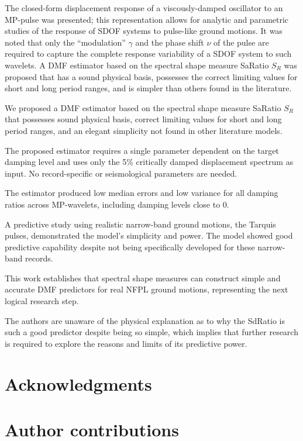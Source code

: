 The closed-form displacement response of a viscously-damped oscillator
to an MP-pulse was presented; this representation allows for analytic
and parametric studies of the response of SDOF systems to pulse-like
ground motions. It was noted that only the ``modulation'' \(\gamma\) and
the phase shift \(\nu\) of the pulse are required to capture the
complete response variability of a SDOF system to such wavelets. A DMF
estimator based on the spectral shape measure SaRatio \(S_R\) was
proposed that has a sound physical basis, possesses the correct limiting
values for short and long period ranges, and is simpler than others
found in the literature.

We proposed a DMF estimator based on the spectral shape measure SaRatio
\(S_R\) that possesses sound physical basis, correct limiting values for
short and long period ranges, and an elegant simplicity not found in
other literature models.

The proposed estimator requires a single parameter dependent on the
target damping level and uses only the 5\% critically damped
displacement spectrum as input. No record-specific or seismological
parameters are needed.

The estimator produced low median errors and low variance for all
damping ratios across MP-wavelets, including damping levels close to 0.

A predictive study using realistic narrow-band ground motions, the
Tarquis pulses, demonstrated the model's simplicity and power. The model
showed good predictive capability despite not being specifically
developed for these narrow-band records.

This work establishes that spectral shape measures can construct simple
and accurate DMF predictors for real NFPL ground motions, representing
the next logical research step.

The authors are unaware of the physical explanation as to why the
SdRatio is such a good predictor despite being so simple, which implies
that further research is required to explore the reasons and limits of
its predictive power.

\section{Acknowledgments}\label{acknowledgments}

\section{Author contributions}\label{author-contributions}

